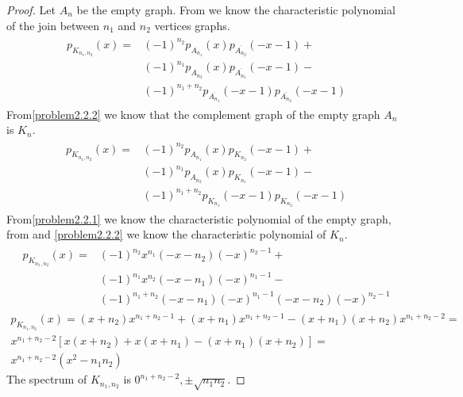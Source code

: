 \documentclass[a4paper, 11pt, oneside]{article}
\begin{document}
\begin{proof}
Let $A_n$  be the empty graph.
From \cite[Lemma 11]{adjacency_matrix} we know the characteristic polynomial of the join between $n_1$ and $n_2$ vertices graphs.
\begin{align*}
\begin{split}
p_{K_{n_1,n_2}}(x) = & (-1)^{n_2} p_{A_{n_1}}(x)   p_{\overline{A_{n_2}}}(-x-1) + \\
								   & (-1)^{n_1} p_{A_{n_2}} (x)  p_{\overline{A_{n_1}}}(-x-1) -  \\
								   &  (-1)^{n_1 + n_2} p_{\overline{A_{n_1}}}(-x-1) p_{\overline{A_{n_2}}}(-x-1)
\end{split}
\end{align*}
From\ref{problem2.2.2} we know that the complement graph of the empty graph $A_n$ is $K_n$.
\begin{align*}
\begin{split}
 p_{K_{n_1,n_2}}(x)  = & (-1)^{n_2} p_{A_{n_1}}(x)   p_{K_{n_2}}(-x-1) + \\
								   & (-1)^{n_1} p_{A_{n_2}} (x)  p_{K_{n_1}}(-x-1) -  \\
								   &  (-1)^{n_1 + n_2} p_{K_{n_1}}(-x-1) p_{K_{n_2}}(-x-1)
\end{split}
\end{align*}
From\ref{problem2.2.1} we know the characteristic polynomial of the empty graph, from \cite[Example 4]{adjacency_matrix} and \ref{problem2.2.2} we know the characteristic polynomial of $K_n$.
\begin{align*}
\begin{split}
   p_{K_{n_1,n_2}}(x)   = & (-1)^{n_2} x^{n_1}   (-x - n_2)(-x) ^{n_2 - 1} + \\
								   & (-1)^{n_1} x^{n_2}  (-x - n_1)(-x) ^{n_1 - 1}-  \\
								   &  (-1)^{n_1 + n_2} (-x - n_1)(-x) ^{n_1 - 1} (-x - n_2)(-x) ^{n_2 - 1}
\end{split}
\end{align*}
\begin{multline*}
p_{K_{n_1,n_2}}(x) = (x + n_2) x ^ {n_1 + n_2 -1} + (x + n_1) x ^ {n_1 + n_2 -1} - (x + n_1)(x + n_2)x^{n_1 + n_2 - 2} =\\
x ^ {n_1 + n_2 - 2} [ x(x + n_2) + x(x + n_1) - (x + n_1)(x + n_2)] =\\
x ^ {n_1 + n_2 - 2}  (x^2 - n_1n_2)
\end{multline*}
The spectrum of $K_{n_1,n_2}$ is $0 ^ {n_1 + n_2 - 2}, \pm\sqrt{n_1n_2}$.
\end{proof}
\end{document}

